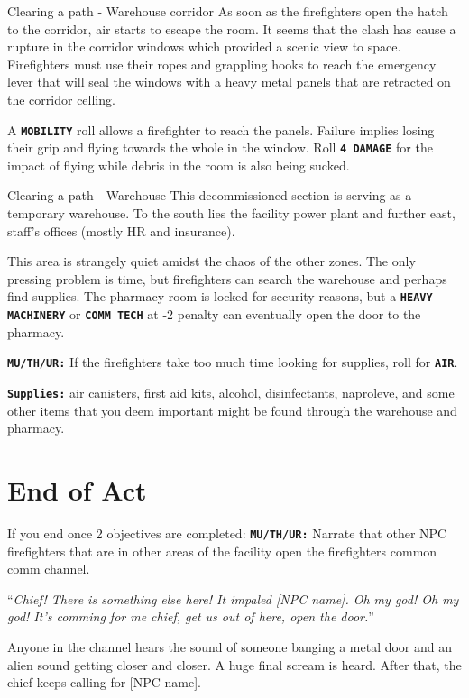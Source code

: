 \begin{rpg-commentbox}{Clearing a path - Warehouse corridor}
    As soon as the firefighters open the hatch to the corridor, air starts to escape the room. It seems that the clash has cause a rupture in the corridor windows which provided a scenic view to space. Firefighters must use their ropes and grappling hooks to reach the emergency lever that will seal the windows with a heavy metal panels that are retracted on the corridor celling.
    
    A \texttt{\textbf{MOBILITY}} roll allows a firefighter to reach the panels. Failure implies losing their grip and flying towards the whole in the window. Roll \texttt{\textbf{4 DAMAGE}} for the impact of flying while debris in the room is also being sucked. 
\end{rpg-commentbox}




\begin{rpg-commentbox}{Clearing a path - Warehouse}
    This decommissioned section is serving as a temporary warehouse. To the south lies the facility power plant and further east, staff's offices (mostly HR and insurance).
    
    This area is strangely quiet amidst the chaos of the other zones. The only pressing problem is time, but firefighters can search the warehouse and perhaps find supplies. The pharmacy room is locked for security reasons, but a \texttt{\textbf{HEAVY MACHINERY}} or \texttt{\textbf{COMM TECH}} at -2 penalty can eventually open the door to the pharmacy.

    
    \texttt{\textbf{MU/TH/UR:}} If the firefighters take too much time looking for supplies, roll for \texttt{\textbf{AIR}}.

    
    
    \texttt{\textbf{Supplies:}} air canisters, first aid kits, alcohol, disinfectants, naproleve, and some other items that you deem important might be found through the warehouse and pharmacy.
\end{rpg-commentbox}

\newsect

\section{End of Act}




\begin{rpg-commentbox}{If you end once 2 objectives are completed:}
    \texttt{\textbf{MU/TH/UR:}} Narrate that other NPC firefighters that are in other areas of the facility open the firefighters common comm channel. 

    ``\textit{Chief! There is something else here! It impaled [NPC name]. Oh my god! Oh my god! It's comming for me chief, get us out of here, open the door.}''

    Anyone in the channel hears the sound of someone banging a metal door and an alien sound getting closer and closer. A huge final scream is heard. After that, the chief keeps calling for [NPC name].
\end{rpg-commentbox}



